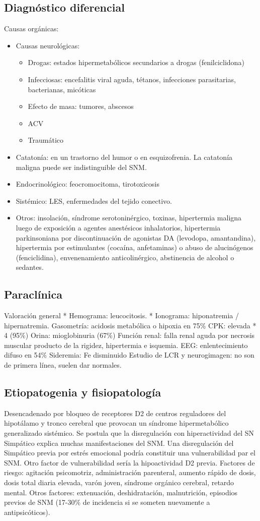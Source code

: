 \documentclass{scrbook}
\begin{document}
\subsection*{Diagnóstico diferencial}
Causas orgánicas:
\begin{itemize}
	\item Causas neurológicas:
	\begin{itemize}
		\item Drogas: estados hipermetabólicos secundarios a drogas (fenilciclidona)
		\item Infecciosas: encefalitis viral aguda, tétanos, infecciones parasitarias, bacterianas, micóticas
		\item Efecto de masa: tumores, abscesos
		\item ACV
		\item Traumático
	\end{itemize}
	\item Catatonía: en un trastorno del humor o en esquizofrenia. La catatonía maligna puede ser indistinguible del SNM.
	\item Endocrinológico: feocromocitoma, tirotoxicosis
	\item Sistémico: LES, enfermedades del tejido conectivo.
	\item Otros: insolación, síndrome serotoninérgico, toxinas, hipertermia maligna luego de exposición a agentes anestésicos inhalatorios, hipertermia parkinsoniana por discontinuación de agonistas DA (levodopa, amantandina), hipertermia por estimulantes (cocaína, anfetaminas) o abuso de alucinógenos (fenciclidina), envenenamiento anticolinérgico, abstinencia de alcohol o sedantes.
\end{itemize}
\subsection*{Paraclínica}
Valoración general
* Hemograma: leucocitosis.
* Ionograma: hiponatremia / hipernatremia.
Gasometría: acidosis metabólica o hipoxia en 75\%
CPK: elevada * 4 (95\%)
Orina: mioglobinuria (67\%)
Función renal: falla renal aguda por necrosis muscular producto de la rigidez, hipertermia e isquemia.
EEG: enlentecimiento difuso en 54\%
Sideremia: Fe disminuido
Estudio de LCR y neurogimagen: no son de primera línea, suelen dar normales.
\subsection*{Etiopatogenia y fisiopatología}
Desencadenado por bloqueo de receptores D2 de centros reguladores del hipotálamo y tronco cerebral que provocan un síndrome hipermetabólico generalizado sistémico. Se postula que la disregulación con hiperactividad del SN Simpático explica muchas manifestaciones del SNM. 
Una disregulación del Simpático previa por estrés emocional podría constituir una vulnerabilidad par el SNM. Otro factor de vulnerabilidad sería la hipoactividad D2 previa.
Factores de riesgo: agitación psicomotriz, administración parenteral, aumento rápido de dosis, dosis total diaria elevada, varón joven, síndrome orgánico cerebral, retardo mental.
Otros factores: extenuación, deshidratación, malnutrición, episodios previos de SNM (17-30\% de incidencia si se someten nuevamente a antipsicóticos).
\end{document}
